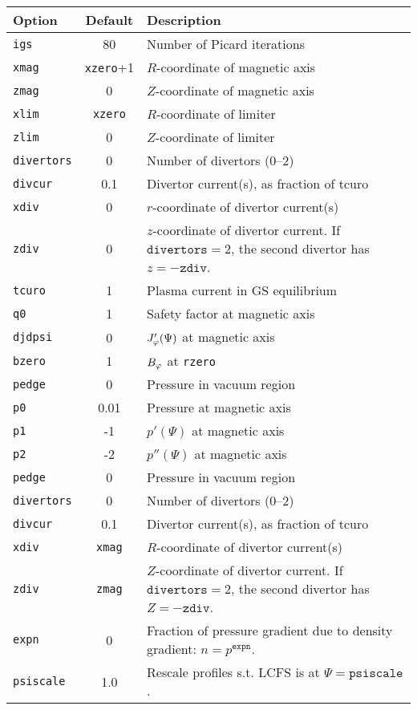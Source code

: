 \begin{tabular}{lcp{3in}}
  \textbf{Option}&\textbf{Default}&\textbf{Description}\\
  \hline
  \texttt{igs}   & 80     & Number of Picard iterations\\
  \texttt{xmag}  & \texttt{xzero}+1 & $R$-coordinate of magnetic axis\\
  \texttt{zmag}  & 0      & $Z$-coordinate of magnetic axis\\
  \texttt{xlim}  & \texttt{xzero}   & $R$-coordinate of limiter\\
  \texttt{zlim}  & 0      & $Z$-coordinate of limiter\\
  \hline
  \texttt{divertors} & 0  & Number of divertors (0--2)\\
  \texttt{divcur}& 0.1    & Divertor current(s), as fraction of tcuro\\
  \texttt{xdiv}  & 0      & $r$-coordinate of divertor current(s)\\
  \texttt{zdiv}  & 0      & \parbox[t]{3in}{$z$-coordinate of 
    divertor 
    current.  If $\mathtt{divertors} = 2$, the second divertor has 
    $z = -\mathtt{zdiv}$.}\\
  \hline
  \texttt{tcuro} & 1      & Plasma current in GS equilibrium\\
  \texttt{q0}    & 1      & Safety factor at magnetic axis\\
  \texttt{djdpsi}& 0      & $J_\varphi'(\Psi)$ at magnetic axis\\
  \texttt{bzero} & 1      & $B_\varphi$ at \texttt{rzero}\\
  \texttt{pedge} & 0      & Pressure in vacuum region\\
  \texttt{p0}    & 0.01   & Pressure at magnetic axis\\
  \texttt{p1}    & -1     & $p'(\Psi)$ at magnetic axis\\
  \texttt{p2}    & -2     & $p''(\Psi)$ at magnetic axis\\
  \texttt{pedge} & 0      & Pressure in vacuum region\\
  \texttt{divertors} & 0  & Number of divertors (0--2)\\
  \texttt{divcur}& 0.1    & Divertor current(s), as fraction of tcuro\\
  \texttt{xdiv}  & \texttt{xmag} & $R$-coordinate of divertor current(s)\\
  \texttt{zdiv}  & \texttt{zmag} & \parbox[t]{3in}{$Z$-coordinate of 
    divertor 
    current.  If $\mathtt{divertors} = 2$, the second divertor has 
    $Z = -\mathtt{zdiv}$.}\\
  \texttt{expn}  & 0 & \parbox[t]{3in}{Fraction of pressure gradient due to
    density gradient: $n = p^\mathtt{expn}$.}\\
  \texttt{psiscale} & 1.0 & Rescale profiles s.t. LCFS is at 
  $\Psi=\mathtt{psiscale}$.
\end{tabular}



